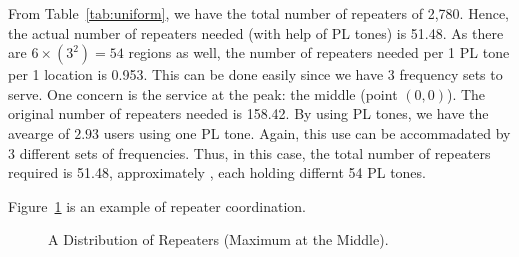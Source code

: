 \documentclass{icmmcm}
\begin{document}
From Table~\ref{tab:uniform}, we have the total number of repeaters of 2,780. Hence, the actual number of repeaters needed (with help of PL tones) is 51.48. As there are $6\times(3^2)=54$ regions as well, the number of repeaters needed per 1 PL tone per 1 location is 0.953. This can be done easily since we have 3 frequency sets to serve. One concern is the service at the peak: the middle (point $(0,0)$). The original number of repeaters needed is 158.42. By using PL tones, we have the avearge of $2.93$ users using one PL tone. Again, this use can be accommadated by 3 different sets of frequencies. Thus, in this case, the total number of repeaters required is 51.48, approximately  , each holding differnt 54 PL tones.


Figure~\ref{fig:sample1} is an example of repeater coordination.
\begin{figure}[ht]
\begin{center}
\end{center}
\caption[A Distribution of Repeaters for a Uniform People Distribution]{A Distribution of Repeaters (Maximum at the Middle).\label{sample1}}%
\label{fig:sample1}
\end{figure}
\end{document}
